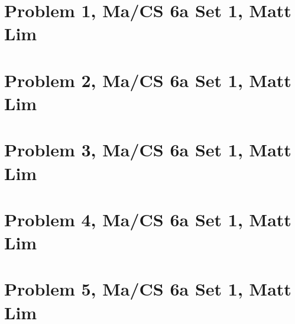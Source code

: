 \documentclass{article}
\begin{document}
\section*{Problem 1, Ma/CS 6a Set 1, Matt Lim}
\newpage
\section*{Problem 2, Ma/CS 6a Set 1, Matt Lim}
\newpage
\section*{Problem 3, Ma/CS 6a Set 1, Matt Lim}
\newpage
\section*{Problem 4, Ma/CS 6a Set 1, Matt Lim}
\newpage
\section*{Problem 5, Ma/CS 6a Set 1, Matt Lim}
\newpage
\end{document}
